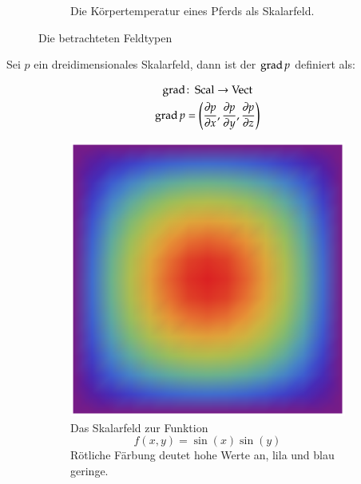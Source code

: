 \begin{figure}
\begin{subfigure}[t]{0.5\textwidth}
		\caption{Die Körpertemperatur eines Pferds als Skalarfeld.}
		\label{fig:mathematics_scalarfield}
	\end{subfigure}
	\caption{Die betrachteten Feldtypen}
\end{figure}

Sei $p$ ein dreidimensionales Skalarfeld, dann ist der 
$\operatorname*{grad} p$ definiert als:

\begin{gather}
\operatorname*{grad} \colon \operatorname*{Scal} \to \operatorname*{Vect} \\
\operatorname*{grad} p
=
\left( \frac{\partial p}{\partial x},\frac{\partial p}{\partial y},\frac{\partial p}{\partial z} \right)
\end{gather}

\begin{figure}[ht]
        \captionsetup{singlelinecheck=off}
	\begin{subfigure}[t]{0.5\textwidth}
		\centering
		\includegraphics[width=\textwidth]{images/scalar_field_to_show_gradient}
		\caption{Das Skalarfeld zur Funktion \[ f(x,y) = \sin(x)\sin(y) \] Rötliche Färbung deutet hohe Werte an, lila und blau geringe.}
		\label{fig:mathematics_sample_scalar_field}
	\end{subfigure}
	~
	\begin{subfigure}[t]{0.5\textwidth}

\end{subfigure}
\end{figure}
